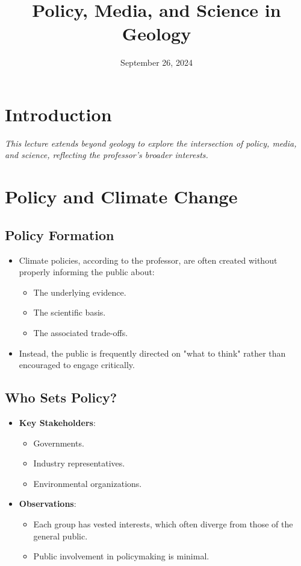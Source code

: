\documentclass[12pt]{article}
\title{Policy, Media, and Science in Geology}
\author{}
\date{September 26, 2024}
\begin{document}
\maketitle

\section*{Introduction}
\textit{This lecture extends beyond geology to explore the intersection of policy, media, and science, reflecting the professor's broader interests.}

\section*{Policy and Climate Change}
\subsection*{Policy Formation}
\begin{itemize}
    \item Climate policies, according to the professor, are often created without properly informing the public about:
    \begin{itemize}
        \item The underlying evidence.
        \item The scientific basis.
        \item The associated trade-offs.
    \end{itemize}
    \item Instead, the public is frequently directed on "what to think" rather than encouraged to engage critically.
\end{itemize}

\subsection*{Who Sets Policy?}
\begin{itemize}
    \item \textbf{Key Stakeholders}:
    \begin{itemize}
        \item Governments.
        \item Industry representatives.
        \item Environmental organizations.
    \end{itemize}
    \item \textbf{Observations}:
    \begin{itemize}
        \item Each group has vested interests, which often diverge from those of the general public.
        \item Public involvement in policymaking is minimal.
    \end{itemize}
\end{itemize}
\end{document}
